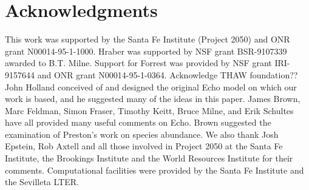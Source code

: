 \section{Acknowledgments}

This work was supported by the Santa Fe Institute (Project 2050) and
ONR grant N00014-95-1-1000.  Hraber was supported by NSF grant
BSR-9107339 awarded to B.T. Milne.  Support for Forrest was provided
by NSF grant IRI-9157644 and ONR grant N00014-95-1-0364.  Acknowledge
THAW foundation??  John Holland conceived of and designed the original
Echo model on which our work is based, and he suggested many of the
ideas in this paper.  James Brown, Marc Feldman, Simon Fraser, Timothy
Keitt, Bruce Milne, and Erik Schultes have all provided many useful
comments on Echo.  Brown suggested the examination of Preston's work
on species abundance. We also thank Josh Epstein, Rob Axtell and all
those involved in Project 2050 at the Santa Fe Institute, the
Brookings Institute and the World Resources Institute for their
comments.  Computational facilities were provided by the Santa Fe
Institute and the Sevilleta LTER.


